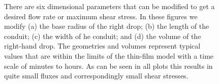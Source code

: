 \documentclass{jfm}
\begin{document}
\begin{figure} 
    \caption{
    There are six dimensional parameters that can be  modified to get a desired flow rate or maximum shear stress.
    In these figures we modify (a)  the base radius of the right drop;  (b) the length of the conduit; (c) the width of he conduit; and (d) the volume of the right-hand drop. 
    The geometries and volumes represent typical values that are within the limits of the thin-film model with  a time scale of minutes to  hours.
    As can be seen in all plots this results in quite small fluxes and correspondingly small shear stresses.
    }  \label{fig: circuits}
\end{figure}
 




 
 
 
\end{document}
